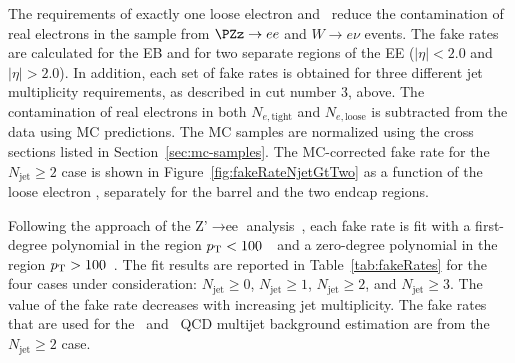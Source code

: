 The requirements of exactly one loose electron and \MET~reduce
the contamination of real electrons in the sample from $\PZz \rightarrow ee$
and $W \rightarrow e\nu$ events.
The fake rates are calculated for the EB and for two separate regions of the EE
($|\eta| < 2.0$ and $|\eta| > 2.0$). In addition, each set of fake rates
is obtained for three different jet multiplicity requirements, as described 
in cut number 3, above.  The contamination of real electrons in both
$N_{e, \text{tight}}$ and $N_{e, \text{loose}}$ is subtracted from the data using
MC predictions. The MC samples are normalized using the cross sections listed in 
Section~\ref{sec:mc-samples}. The MC-corrected fake rate for the  
$N_{\text{jet}} \geq 2$ case is shown in Figure~\ref{fig:fakeRateNjetGtTwo} as a 
function of the loose electron \pt, separately for the barrel and the two endcap regions.  

Following the approach of the Z'$\rightarrow \mbox{ee}$ analysis~\cite{zprime-2011}, each fake rate is fit 
with a first-degree polynomial in the region $\mbox{\ensuremath{p_{\text{T}}}} < 100$~\GeV~and 
a zero-degree polynomial in the region $\mbox{\ensuremath{p_{\text{T}}}} > 100$~\GeV.
The fit results are reported in Table~\ref{tab:fakeRates} for the four cases under consideration:
$N_{\text{jet}} \geq 0$, $N_{\text{jet}} \geq 1$, $N_{\text{jet}} \geq 2$, and
$N_{\text{jet}} \geq 3$.  The value of the fake rate decreases with increasing jet multiplicity. 
The fake rates that are used for the \eejj~and \enujj~QCD multijet background estimation 
are from the $N_{\text{jet}} \geq 2$ case.

